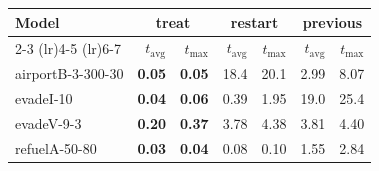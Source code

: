 \begin{tabular}{lrrrrrr}
\toprule
\multirow{2}{*}{Model} & \multicolumn{2}{c}{treat} & \multicolumn{2}{c}{restart} & \multicolumn{2}{c}{previous} \\
    \cmidrule(lr){2-3} \cmidrule(lr){4-5} \cmidrule(lr){6-7}
 & $t_\text{avg}$ & $t_\text{max}$ & $t_\text{avg}$ & $t_\text{max}$ & $t_\text{avg}$ & $t_\text{max}$ \\
\midrule
airportB-3-300-30 & \textbf{0.05} & \textbf{0.05} & 18.4 & 20.1 & 2.99 & 8.07 \\
evadeI-10 & \textbf{0.04} & \textbf{0.06} & 0.39 & 1.95 & 19.0 & 25.4 \\
evadeV-9-3 & \textbf{0.20} & \textbf{0.37} & 3.78 & 4.38 & 3.81 & 4.40 \\
refuelA-50-80 & \textbf{0.03} & \textbf{0.04} & 0.08 & 0.10 & 1.55 & 2.84 \\
\bottomrule
\end{tabular}
